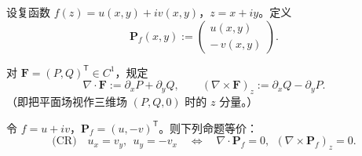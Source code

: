 \documentclass[lang=cn,10pt]{elegantbook}
\begin{document}
\begin{definition}
设复函数 $f(z)=u(x,y)+iv(x,y)$，$z=x+iy$。定义
\[
\mathbf P_f(x,y):=\begin{pmatrix}u(x,y)\\ -\,v(x,y)\end{pmatrix}.
\]
\end{definition}

\begin{definition}[旋度]
对 $\mathbf F=(P,Q)^{\mathsf T}\in C^{1}$，规定
\[
\nabla\!\cdot\!\mathbf F:=\partial_x P+\partial_y Q,\qquad
(\nabla\!\times\!\mathbf F)_z:=\partial_x Q-\partial_y P.
\]
（即把平面场视作三维场 $(P,Q,0)$ 时的 $z$ 分量。）
\end{definition}

\begin{theorem}
令 $f=u+iv$，$\mathbf P_f=(u,-v)^{\mathsf T}$。则下列命题等价：
\[
\text{(CR)}\quad u_x=v_y,\ \ u_y=-v_x
\quad\Longleftrightarrow\quad
\nabla\!\cdot\!\mathbf P_f=0,\ \ (\nabla\!\times\!\mathbf P_f)_z=0 .
\]
\end{theorem}
\end{document}
